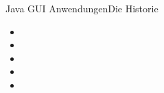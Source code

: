 \begin{frame}{Java GUI Anwendungen}{Die Historie}
    \begin{itemize}
        \item
        \item
        \item
        \item
        \item
    \end{itemize}
\end{frame}